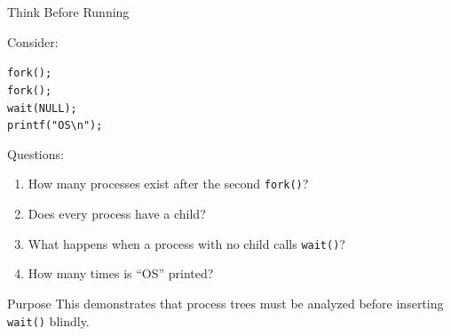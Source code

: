 \documentclass[aspectratio=169]{beamer}
\begin{document}
\begin{frame}{Think Before Running}

Consider:

\begin{center}

\texttt{fork();}\\
\texttt{fork();}\\
\texttt{wait(NULL);}\\
\texttt{printf("OS\textbackslash n");}

\end{center}

Questions:

\begin{enumerate}

    \item How many processes exist after the second \texttt{fork()}?

    \item Does every process have a child?

    \item What happens when a process with no child calls \texttt{wait()}?

    \item How many times is ``OS'' printed?

\end{enumerate}

\begin{alertblock}{Purpose}
This demonstrates that process trees must be analyzed before inserting
\texttt{wait()} blindly.
\end{alertblock}

\end{frame}
\end{document}
